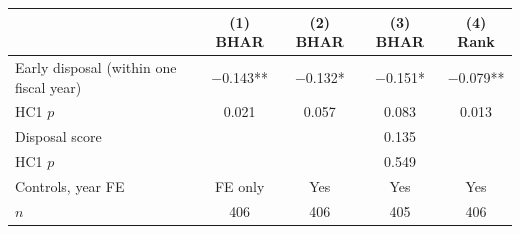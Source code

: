 \begin{tabular}{lcccc}
\toprule
 & (1) BHAR & (2) BHAR & (3) BHAR & (4) Rank \\
\midrule
Early disposal (within one fiscal year) & $-$0.143** & $-$0.132* & $-$0.151* & $-$0.079** \\
\quad HC1 $p$ & 0.021 & 0.057 & 0.083 & 0.013 \\
Disposal score & & & 0.135 & \\
\quad HC1 $p$ & & & 0.549 & \\
Controls, year FE & FE only & Yes & Yes & Yes \\
$n$ & 406 & 406 & 405 & 406 \\
\bottomrule
\end{tabular}
